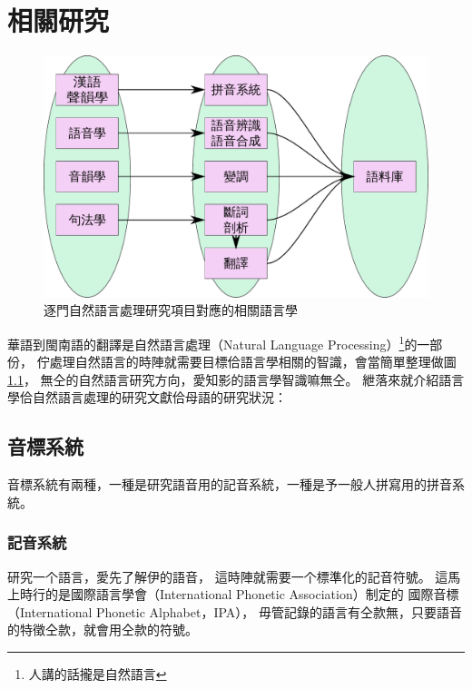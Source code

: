\chapter{相關研究}
\label{章：相關研究}

\begin{figure}
\centerline{\includegraphics[keepaspectratio,width=40em]{圖/相關研究智識}}
\caption{逐門自然語言處理研究項目對應的相關語言學}
\label{圖：相關研究智識}
\end{figure}


華語到閩南語的翻譯是自然語言處理（Natural Language Processing）\footnote{人講的話攏是自然語言}的一部份，
佇處理自然語言的時陣就需要目標佮語言學相關的智識，會當簡單整理做圖\ref{圖：相關研究智識}，
無仝的自然語言研究方向，愛知影的語言學智識嘛無仝。
紲落來就介紹語言學佮自然語言處理的研究文獻佮母語的研究狀況：

\section{音標系統}
\label{節：音標系統}
音標系統有兩種，一種是研究語音用的記音系統，一種是予一般人拼寫用的拼音系統。

\subsection{記音系統}
\label{小節：記音系統}
研究一个語言，愛先了解伊的語音，
這時陣就需要一个標準化的記音符號。
這馬上時行的是國際語言學會（International Phonetic Association）制定的
國際音標（International Phonetic Alphabet，IPA）\cite{WIKI國際音標}，
毋管記錄的語言有仝款無，只要語音的特徵仝款，就會用仝款的符號。

